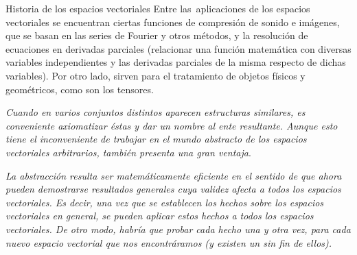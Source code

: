 \begin{myexampleblock}{Historia de los espacios vectoriales}
\vspace{2mm} Entre las aplicaciones de los espacios vectoriales se encuentran ciertas funciones de compresión de sonido e imágenes, que se basan en las series de Fourier y otros métodos, y la resolución de ecuaciones en derivadas parciales (relacionar una función matemática con diversas variables independientes y las derivadas parciales de la misma respecto de dichas variables). Por otro lado, sirven para el tratamiento de objetos físicos y geométricos, como son los tensores.

\vspace{6mm} \emph{Cuando en varios conjuntos distintos aparecen estructuras similares, es conveniente axiomatizar éstas y dar un nombre al ente resultante. Aunque esto tiene el inconveniente de trabajar en el mundo abstracto de los espacios vectoriales arbitrarios, también presenta una gran ventaja}.


\vspace{2mm} \emph{ La abstracción resulta ser matemáticamente eficiente en el sentido de que ahora pueden demostrarse resultados generales cuya validez afecta a todos los espacios vectoriales. Es decir, una vez que se establecen los hechos sobre los espacios vectoriales en general, se pueden aplicar estos hechos a todos los espacios vectoriales. De otro modo, habría que probar cada hecho una y otra vez, para cada nuevo espacio vectorial que nos encontráramos (y existen un sin fin de ellos).}
	
\end{myexampleblock}




		
%
%


